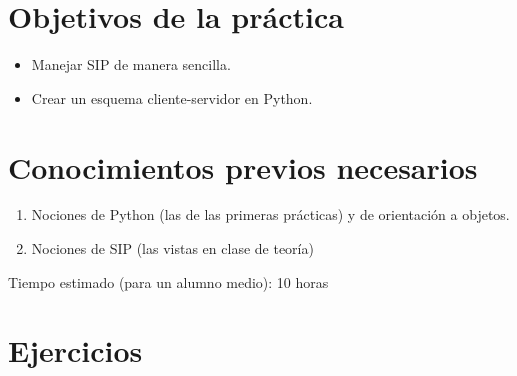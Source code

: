 \documentclass[11pt,a4paper]{article}
\begin{document}
\section{Objetivos de la práctica}

\begin{itemize}
  \item Manejar SIP de manera sencilla.
  \item Crear un esquema cliente-servidor en Python.
\end{itemize}

\section{Conocimientos previos necesarios}

\begin{enumerate}
  \item Nociones de Python (las de las primeras prácticas) y de orientación a objetos.
  \item Nociones de SIP (las vistas en clase de teoría)
\end{enumerate}

Tiempo estimado (para un alumno medio): 10 horas

\section{Ejercicios}
\end{document}
